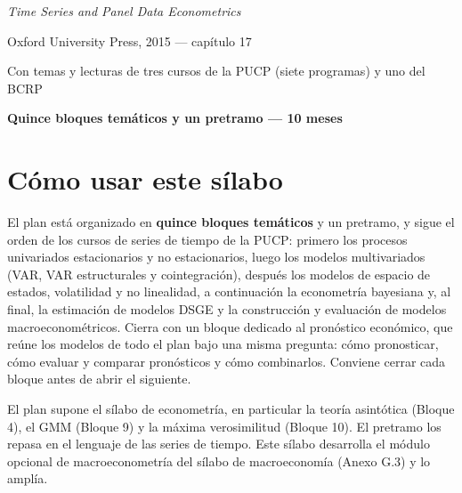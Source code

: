 \documentclass[11pt,a4paper]{article}
\newcommand{\destacado}[1]{{\sffamily\bfseries\color{tonoPrincipal}#1}}
\begin{document}
\begin{titlepage}
{\normalsize \emph{\color{colorPs}Time Series and Panel Data Econometrics}\par}
{\small\color{tonoPizarra} Oxford University Press, 2015 --- capítulo 17\par}
\vspace{0.35cm}
{\normalsize\color{colorPUCP} Con temas y lecturas de tres cursos de la PUCP (siete programas) y uno del BCRP\par}
\vfill
{\setlength{\fboxsep}{6pt}\colorbox{tonoPrincipal}{\normalsize\sffamily\bfseries\color{white} Quince bloques temáticos y un pretramo --- 10 meses}\par}
\vspace{0.2cm}
\end{titlepage}

\tableofcontents
\newpage

\section*{Cómo usar este sílabo}

El plan está organizado en \textbf{quince bloques temáticos} y un pretramo, y
sigue el orden de los cursos de series de tiempo de la PUCP: primero los
procesos univariados estacionarios y no estacionarios, luego los modelos
multivariados (VAR, VAR estructurales y cointegración), después los modelos de
espacio de estados, volatilidad y no linealidad, a continuación la
econometría bayesiana y, al final, la estimación de modelos DSGE y la
construcción y evaluación de modelos macroeconométricos. Cierra con un bloque
dedicado al pronóstico económico, que reúne los modelos de todo el plan bajo
una misma pregunta: cómo pronosticar, cómo evaluar y comparar pronósticos y
cómo combinarlos. Conviene cerrar cada bloque antes de abrir el siguiente.

\medskip
\noindent\destacado{Requisito.} El plan supone el sílabo de econometría,
en particular la teoría asintótica (Bloque 4), el GMM (Bloque 9) y la máxima
verosimilitud (Bloque 10). El pretramo los repasa en el lenguaje de las series
de tiempo. Este sílabo desarrolla el módulo opcional de macroeconometría del
sílabo de macroeconomía (Anexo G.3) y lo amplía.
\end{document}
